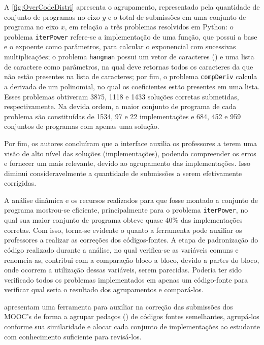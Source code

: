 		A \cref{fig:OverCodeDistri} apresenta o agrupamento, representado pela quantidade de
		conjunto de programas no eixo $y$ e o total de submissões em uma conjunto de programa no eixo $x$,  em relação a
		três problemas resolvidos em Python: o problema \texttt{iterPower} refere-se a
		implementação de uma função, que possui a base e o expoente como parâmetros, para
		calcular o exponencial com sucessivas multiplicações; o problema \texttt{hangman}
		possui um vetor de caracteres () e uma lista de caractere como
		parâmetros, na qual deve retornas todos os caracteres da  que não
		estão presentes na lista de caracteres; por fim, o problema \texttt{compDeriv}
		calcula a derivada de um polinomial, no qual os coeficientes estão presentes em
		uma lista. Esses problemas obtiveram 3875, 1118 e 1433 soluções corretas submetidas,
		respectivamente. Na devida ordem, a maior conjunto de programa de cada problema são constituídas
		de 1534, 97 e 22 implementações e 684, 452 e 959 conjuntos de programas com apenas uma solução.

		Por fim, os autores concluíram que a interface auxilia os professores a terem
		uma visão de alto nível das soluções (implementações), podendo compreender os
		erros e fornecer um  mais relevante, devido ao agrupamento
		das implementações. Isso diminui consideravelmente a quantidade de submissões
		a serem efetivamente corrigidas.
		
		A análise dinâmica e os recursos realizados para que fosse montado a conjunto de programa
		mostrou-se eficiente, principalmente para o problema \texttt{iterPower}, no
		qual sua maior conjunto de programa obteve quase 40\% das implementações corretas. Com isso,
		torna-se evidente o quanto a ferramenta pode auxiliar os professores a realizar
		as correções dos códigos-fontes. A etapa de padronização do código realizado
		durante a análise, no qual verifica-se as variáveis comuns e renomeia-as,
		contribui com a comparação bloco a bloco, devido a partes do bloco, onde
		ocorrem a utilização dessas variáveis, serem parecidas. Poderia ter sido
		verificado todos os problemas implementados em apenas um código-fonte para
		verificar qual seria o resultado dos agrupamentos e compará-los.
		
		 apresentam uma ferramenta para auxiliar na correção das
		submissões dos MOOC's de forma a agrupar pedaços () de códigos
		fontes semelhantes, agrupá-los conforme sua similaridade e alocar cada conjunto
		de implementações ao estudante com conhecimento suficiente para revisá-los.
		
